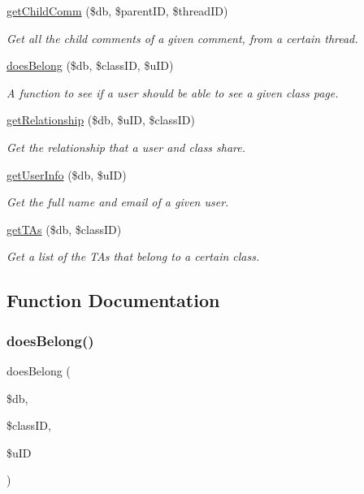 \begin{DoxyCompactItemize}
\mbox{\hyperlink{database_8php_a8c9bc786d24bccf7dd4e424b31f44339}{get\+Child\+Comm}} (\$db, \$parent\+ID, \$thread\+ID)
\begin{DoxyCompactList}\small\item\em Get all the child comments of a given comment, from a certain thread. \end{DoxyCompactList}\item 
\mbox{\hyperlink{database_8php_a871b0aa699dda405ec1195757f23a3ed}{does\+Belong}} (\$db, \$class\+ID, \$u\+ID)
\begin{DoxyCompactList}\small\item\em A function to see if a user should be able to see a given class page. \end{DoxyCompactList}\item 
\mbox{\hyperlink{database_8php_aebc0a69e88a8d839b0f3902e5ebfb77e}{get\+Relationship}} (\$db, \$u\+ID, \$class\+ID)
\begin{DoxyCompactList}\small\item\em Get the relationship that a user and class share. \end{DoxyCompactList}\item 
\mbox{\hyperlink{database_8php_aa138e957fd5d5f52a5e0a54ae78b74b9}{get\+User\+Info}} (\$db, \$u\+ID)
\begin{DoxyCompactList}\small\item\em Get the full name and email of a given user. \end{DoxyCompactList}\item 
\mbox{\hyperlink{database_8php_a80799794e0ec7459132e9516c09fb227}{get\+T\+As}} (\$db, \$class\+ID)
\begin{DoxyCompactList}\small\item\em Get a list of the T\+As that belong to a certain class. \end{DoxyCompactList}\end{DoxyCompactItemize}


\subsection{Function Documentation}
\mbox{\label{database_8php_a871b0aa699dda405ec1195757f23a3ed}} 
\subsubsection{\texorpdfstring{does\+Belong()}{doesBelong()}}
{\footnotesize\ttfamily does\+Belong (\begin{DoxyParamCaption}\item[{}]{\$db,  }\item[{}]{\$class\+ID,  }\item[{}]{\$u\+ID }\end{DoxyParamCaption})}



